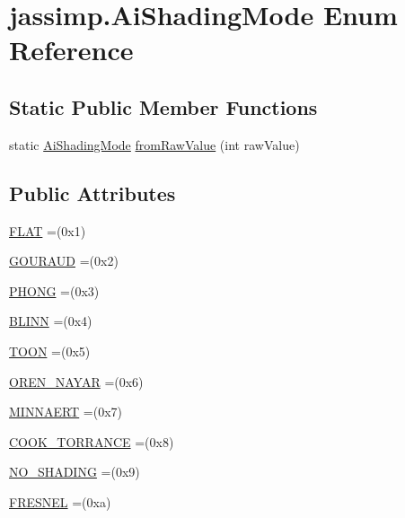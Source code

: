 \hypertarget{enumjassimp_1_1_ai_shading_mode}{\section{jassimp.\+Ai\+Shading\+Mode Enum Reference}
\label{enumjassimp_1_1_ai_shading_mode}
}
\subsection*{Static Public Member Functions}
\begin{DoxyCompactItemize}
\item 
static \hyperlink{enumjassimp_1_1_ai_shading_mode}{Ai\+Shading\+Mode} \hyperlink{enumjassimp_1_1_ai_shading_mode_ac3d06d05d3eab72588f9feefda126792}{from\+Raw\+Value} (int raw\+Value)
\end{DoxyCompactItemize}
\subsection*{Public Attributes}
\begin{DoxyCompactItemize}
\item 
\hyperlink{enumjassimp_1_1_ai_shading_mode_a9dbf2a91f6777baf52d04113a2835b6e}{F\+L\+A\+T} =(0x1)
\item 
\hyperlink{enumjassimp_1_1_ai_shading_mode_a22ec257eac2b18f7fe809fb9b0fb637d}{G\+O\+U\+R\+A\+U\+D} =(0x2)
\item 
\hyperlink{enumjassimp_1_1_ai_shading_mode_a6dff07927df6755a2af66641ae2c2913}{P\+H\+O\+N\+G} =(0x3)
\item 
\hyperlink{enumjassimp_1_1_ai_shading_mode_a5c9f9ee60553aecc6fdea58cd3c28376}{B\+L\+I\+N\+N} =(0x4)
\item 
\hyperlink{enumjassimp_1_1_ai_shading_mode_ae266d2080d878b1bbb1dbe1bd99359a3}{T\+O\+O\+N} =(0x5)
\item 
\hyperlink{enumjassimp_1_1_ai_shading_mode_ad9a2b7cbd9fc644782551062815fad7e}{O\+R\+E\+N\+\_\+\+N\+A\+Y\+A\+R} =(0x6)
\item 
\hyperlink{enumjassimp_1_1_ai_shading_mode_a3a948ad6566455b7a1b0caf90a3c7202}{M\+I\+N\+N\+A\+E\+R\+T} =(0x7)
\item 
\hyperlink{enumjassimp_1_1_ai_shading_mode_a103698684afbe1f51528df8e27ed2306}{C\+O\+O\+K\+\_\+\+T\+O\+R\+R\+A\+N\+C\+E} =(0x8)
\item 
\hyperlink{enumjassimp_1_1_ai_shading_mode_a06ebf687a53427ce01a1bf3953472338}{N\+O\+\_\+\+S\+H\+A\+D\+I\+N\+G} =(0x9)
\item 
\hyperlink{enumjassimp_1_1_ai_shading_mode_aa0e2790016eebbf8bb4c08fefe2360a2}{F\+R\+E\+S\+N\+E\+L} =(0xa)
\end{DoxyCompactItemize}


